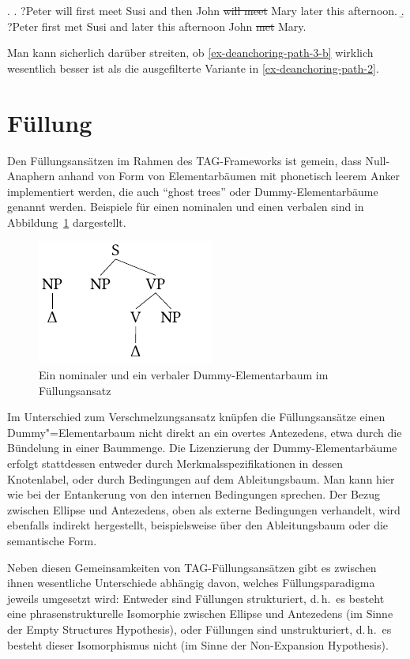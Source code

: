 \ex.
\a. ?Peter will first meet Susi and then John \sout{will meet} Mary later this afternoon.\label{ex-deanchoring-path-3-a}
\b. ?Peter first met Susi and later this afternoon John \sout{met} Mary.\label{ex-deanchoring-path-3-b} 

Man kann sicherlich darüber streiten, ob \ref{ex-deanchoring-path-3-b} wirklich wesentlich besser ist als die ausgefilterte Variante in \ref{ex-deanchoring-path-2}.


\section{Füllung} \label{sec-fuellung}

Den Füllungsansätzen im Rahmen des TAG-Frameworks ist gemein, dass Null-Anaphern anhand von Form von Elementarbäumen mit phonetisch leerem Anker implementiert werden, die auch "`ghost trees"' \citep{Seddah:Sagot:06} oder Dummy-Elementarbäume genannt werden. Beispiele für einen nominalen und einen verbalen  sind in Abbildung~\ref{fig-tag-fuellung-1} dargestellt.
\begin{figure}[t]
\centering
\includegraphics[angle=90]{graphics/abb824.pdf}
\caption{\label{fig-tag-fuellung-1}Ein nominaler und ein verbaler Dummy-Elementarbaum im Füllungsansatz}
\end{figure}  
Im Unterschied zum Verschmelzungsansatz knüpfen die Füllungsansätze einen Dummy"=Elementarbaum nicht direkt an ein overtes Antezedens, etwa durch die Bündelung in einer Baummenge. Die Lizenzierung der Dummy-Elementarbäume erfolgt stattdessen entweder durch Merkmalsspezifikationen in dessen Knotenlabel, oder durch Bedingungen auf dem Ableitungsbaum. Man kann hier wie bei der Entankerung von den internen Bedingungen sprechen. Der Bezug zwischen Ellipse und Antezedens, oben als externe Bedingungen verhandelt, wird ebenfalls indirekt hergestellt, beispielsweise über den Ableitungsbaum oder die semantische Form.

Neben diesen Gemeinsamkeiten von TAG-Füllungsansätzen gibt es zwischen ihnen wesentliche Unterschiede abhängig davon, welches Füllungsparadigma jeweils umgesetzt wird: Entweder sind Füllungen strukturiert, d.\,h.\ es besteht eine phrasenstrukturelle Isomorphie zwischen Ellipse und Antezedens (im Sinne der Empty Structures Hypothesis), oder Füllungen sind unstrukturiert, d.\,h.\ es besteht dieser Isomorphismus nicht (im Sinne der Non-Expansion Hypothesis).



